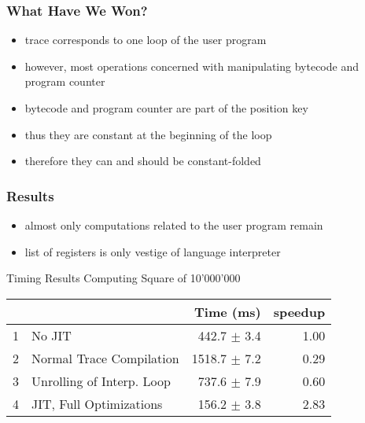 \documentclass[utf8x]{beamer}
\begin{document}
\begin{frame}
    \frametitle{What Have We Won?}
    \begin{itemize}
    \item trace corresponds to one loop of the user program
    \item however, most operations concerned with manipulating bytecode and program counter
    \item bytecode and program counter are part of the position key
    \item thus they are constant at the beginning of the loop
    \item therefore they can and should be constant-folded
    \end{itemize}
\end{frame}


\begin{frame}
    \frametitle{Results}
    \begin{itemize}
    \item almost only computations related to the user program remain
    \item list of registers is only vestige of language interpreter
    \end{itemize}
    \pause
    \begin{block}{Timing Results Computing Square of 10'000'000}
    \begin{tabular}{|l|l|r|r|}
\hline
& &Time (ms) &speedup\\
\hline
1 &No JIT &442.7 $\pm$ 3.4 &1.00\\
2 &Normal Trace Compilation &1518.7 $\pm$ 7.2 &0.29\\
3 &Unrolling of Interp. Loop &737.6 $\pm$ 7.9 &0.60\\
4 &JIT, Full Optimizations &156.2 $\pm$ 3.8 &2.83\\
\hline
\end{tabular}
\end{block}
\end{frame}
\end{document}
